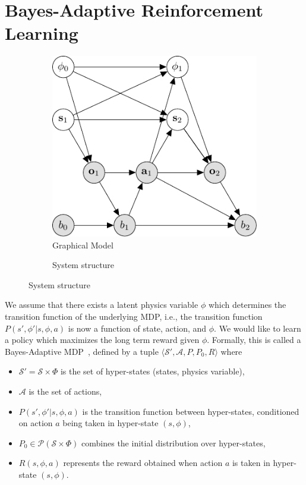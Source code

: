 \documentclass{article}
\begin{document}
\newpage

\section{Bayes-Adaptive Reinforcement Learning}
\begin{figure}[h!]
\begin{subfigure}[b]{0.3\columnwidth}
\includegraphics[width=\linewidth]{figs/model.pdf}
\caption{Graphical Model}
\end{subfigure}
\hfill
\begin{subfigure}[b]{0.65\columnwidth}
\caption{System structure}
\end{subfigure}
\end{figure}

We assume that there exists a latent physics variable $\phi$ which determines the transition function of the underlying MDP, i.e., the transition function  $P(s',\phi' |s, \phi, a)$ is now a function of state, action, and $\phi$. We would like to learn a policy which maximizes the long term reward given $\phi$. Formally, this is called a Bayes-Adaptive MDP~\cite{ghavamzadeh2015bayesian, ross2008bayes, guez2012efficient}, defined by a tuple $\langle \mathcal{S}', \mathcal{A}, P, P_0, R \rangle$ where
\begin{itemize}
\item $\mathcal{S'} = \mathcal{S}\times \Phi$ is the set of hyper-states (states, physics variable),
\item $\mathcal{A}$ is the set of actions,
\item $P(s',\phi'|s, \phi, a)$ is the transition function between hyper-states, conditioned
on action $a$ being taken in hyper-state $(s, \phi)$,
\item $P_0\in \mathcal{P}(\mathcal{S} \times \Phi)$ combines the initial distribution over hyper-states,
\item $R(s, \phi, a)$ represents the reward obtained when action $a$ is
taken in hyper-state $(s,\phi)$.
\end{itemize}
\end{document}
